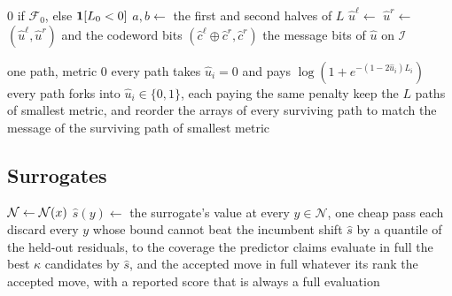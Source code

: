 \documentclass[11pt,a4paper]{article}
\begin{document}
\begin{algorithm}[htbp]
\caption{Successive cancellation on the butterfly,
Equation~\ref{eq:polar-fg}}
\label{alg:successive-cancellation}
\begin{algorithmic}[1]
    \State \Return $0$ if $\mathcal{F}_0$, else $\mathbf{1}[L_0 < 0]$
  \EndIf
  \State $a, b \gets$ the first and second halves of $L$
  \State $\hat u^{\ell} \gets$ 
  \State $\hat u^{r} \gets$ 
  \State \Return $(\hat u^{\ell}, \hat u^{r})$ and the codeword bits
         $(\hat c^{\ell} \oplus \hat c^{r}, \hat c^{r})$
\EndFunction
\State \Return the message bits of $\hat u$ on $\mathcal{I}$
\end{algorithmic}
\end{algorithm}

\begin{algorithm}[htbp]
\caption{Successive-cancellation list decoding, $L$ prefixes
\citep{talvardy2015}}
\label{alg:polar-list}
\begin{algorithmic}[1]
\State one path, metric $0$
    \State every path takes $\hat u_i = 0$ and pays
           $\log(1 + e^{-(1 - 2\hat u_i) L_i})$
  \Else
    \State every path forks into $\hat u_i \in \{0, 1\}$, each paying the same
           penalty
    \State keep the $L$ paths of smallest metric, and reorder the arrays of
           every surviving path to match
  \EndIf
\EndFor
\State \Return the message of the surviving path of smallest metric
\end{algorithmic}
\end{algorithm}

\subsection{Surrogates}
\label{app:algorithms:surrogates}

\begin{algorithm}[htbp]
\caption{Ranking a neighbourhood by a surrogate, Section~\ref{sec:surrogates}}
\label{alg:surrogate-rank}
\begin{algorithmic}[1]
\State $\mathcal{N} \gets \mathcal{N}(x)$
\State $\hat s(y) \gets$ the surrogate's value at every $y \in \mathcal{N}$,
       one cheap pass each
  \State discard every $y$ whose bound cannot beat the incumbent
\Else
  \State shift $\hat s$ by a quantile of the held-out residuals, to the
         coverage the predictor claims
\EndIf
\State evaluate in full the best $\kappa$ candidates by $\hat s$, and the
       accepted move in full whatever its rank
\State \Return the accepted move, with a reported score that is always a full
       evaluation
\end{algorithmic}
\end{algorithm}
\end{document}
